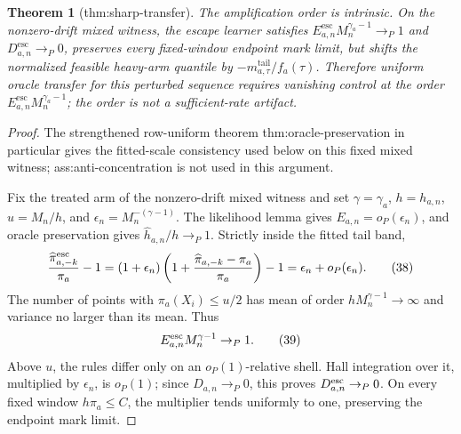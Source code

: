 \documentclass{article}
\newtheorem{theorem}{Theorem}
\begin{document}
\begin{theorem}[thm:sharp-transfer]\label{thm:sharp-transfer}
The amplification order is intrinsic. On the nonzero-drift mixed witness, the escape learner satisfies \(E^{\mathrm{esc}}_{a,n}M_n^{\gamma_a-1}\to_P1\) and \(D^{\mathrm{esc}}_{a,n}\to_P0\), preserves every fixed-window endpoint mark limit, but shifts the normalized feasible heavy-arm quantile by \(-m^{\mathrm{tail}}_{a,\tau}/f_a(\tau)\). Therefore uniform oracle transfer for this perturbed sequence requires vanishing control at the order \(E^{\mathrm{esc}}_{a,n}M_n^{\gamma_a-1}\); the order is not a sufficient-rate artifact.
\end{theorem}
\begin{proof}
The strengthened row-uniform theorem thm:oracle-preservation in particular gives the fitted-scale consistency used below on this fixed mixed witness; ass:anti-concentration is not used in this argument.

Fix the treated arm of the nonzero-drift mixed witness and set
\(\gamma=\gamma_a\), \(h=h_{a,n}\), \(u=M_n/h\), and
\(\epsilon_n=M_n^{-(\gamma-1)}\).  The likelihood lemma gives
\(E_{a,n}=o_P(\epsilon_n)\), and oracle preservation gives
\(\widehat h_{a,n}/h\to_P1\).  Strictly inside the fitted tail band,
\[
\frac{\widehat\pi^{\rm esc}_{a,-k}}{\pi_a}-1
=(1+\epsilon_n)\left(1+\frac{\widehat\pi_{a,-k}-\pi_a}{\pi_a}\right)-1
=\epsilon_n+o_P(\epsilon_n).
\tag{38}
\]
The number of points with \(\pi_a(X_i)\le u/2\) has mean of order
\(hM_n^{\gamma-1}\to\infty\) and variance no larger than its mean.  Thus
\[
E^{\rm esc}_{a,n}M_n^{\gamma-1}\to_P1.
\tag{39}
\]
Above \(u\), the rules differ only on an \(o_P(1)\)-relative shell.  Hall integration over it, multiplied by \(\epsilon_n\), is \(o_P(1)\); since \(D_{a,n}\to_P0\), this proves \(D^{\rm esc}_{a,n}\to_P0\).  On every fixed window \(h\pi_a\le C\), the multiplier tends uniformly to one, preserving the endpoint mark limit.


\end{proof}
\end{document}
